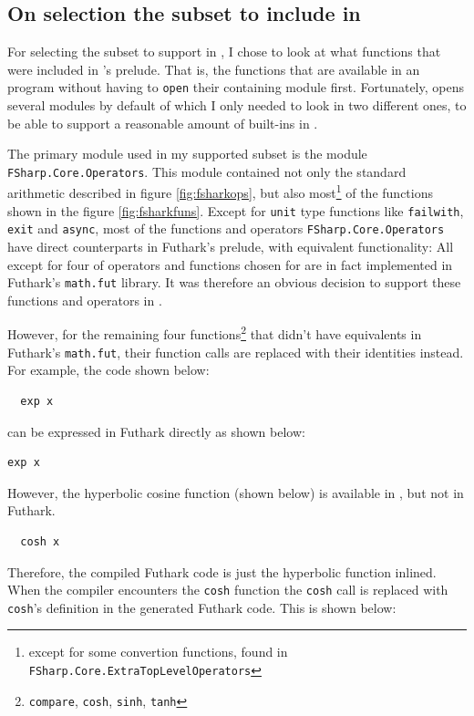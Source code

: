 \subsection{On selection the \fsharp{} subset to include in \fshark{}}
\label{sec:rewritess}
For selecting the \fsharp{} subset to support in \fshark{}, I chose to look at
what functions that were included in \fsharp{}'s prelude. That is, the
functions that are available in an \fsharp{} program without having to
\texttt{open} their containing module first.
Fortunately, \fsharp{} opens several modules by default of which I only
needed to look in two different ones, to be able to support a reasonable amount
of \fsharp{} built-ins in \fshark{}.

The primary module used in my supported \fsharp{} subset is the module
\texttt{FSharp.Core.Operators}.
This module contained not only the standard arithmetic described in figure
\ref{fig:fsharkops}, but also most\footnote{except for some convertion
  functions, found in \texttt{FSharp.Core.ExtraTopLevelOperators}} of the functions shown in the figure \ref{fig:fsharkfuns}.
Except for \texttt{unit} type functions like \texttt{failwith}, \texttt{exit}
and \texttt{async}, most of the functions and operators
\texttt{FSharp.Core.Operators} have direct counterparts in Futhark's prelude,
with equivalent functionality: All except for four of operators and functions chosen for
\fshark{} are in fact implemented in Futhark's \texttt{math.fut} library.
It was therefore an obvious decision to support these functions and operators in
\fshark{}.

However, for the remaining four functions\footnote{\texttt{compare}, \texttt{cosh}, \texttt{sinh}, \texttt{tanh}} that didn't have equivalents in
Futhark's \texttt{math.fut}, their function calls are replaced with their
identities instead.
For example, the \fshark{} code shown below:
\begin{verbatim}
  exp x
\end{verbatim}

can be expressed in Futhark directly as shown below:
\begin{lstlisting}[language=Futhark]
  exp x
\end{lstlisting}

However, the hyperbolic cosine function (shown below) is available in \fsharp{}, but not in Futhark.
\begin{verbatim}
  cosh x
\end{verbatim}
Therefore, the compiled \fshark{} Futhark code is just the hyperbolic function
inlined.
When the \fshark{} compiler encounters the \texttt{cosh} function the \texttt{cosh} call is replaced with
  \texttt{cosh}'s definition in the \fshark{} generated Futhark code. This is
  shown below:
  
